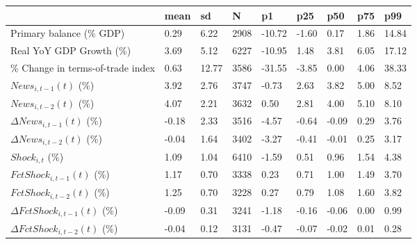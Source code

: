 \begin{table}[htbp]
\begin{tabular}{|l|l|l|l|l|l|l|l|l|}\hline  
 & mean  & sd  & N  & p1  & p25  & p50  & p75  & p99  \\ \hline  
Primary balance (\% GDP) &      0.29 &      6.22 &      2908 &    -10.72 &     -1.60 &      0.17 &      1.86 &     14.84 \\ \hline 
Real YoY GDP Growth (\%) &      3.69 &      5.12 &      6227 &    -10.95 &      1.48 &      3.81 &      6.05 &     17.12 \\ \hline 
\% Change in terms-of-trade index &      0.63 &     12.77 &      3586 &    -31.55 &     -3.85 &      0.00 &      4.06 &     38.33 \\ \hline 
$ News_{i,t-1}(t)$ (\%) &      3.92 &      2.76 &      3747 &     -0.73 &      2.63 &      3.82 &      5.00 &      8.52 \\ \hline 
$ News_{i,t-2}(t)$ (\%) &      4.07 &      2.21 &      3632 &      0.50 &      2.81 &      4.00 &      5.10 &      8.10 \\ \hline 
$ \Delta News_{i,t-1}(t)$ (\%) &     -0.18 &      2.33 &      3516 &     -4.57 &     -0.64 &     -0.09 &      0.29 &      3.76 \\ \hline 
$ \Delta News_{i,t-2}(t)$ (\%) &     -0.04 &      1.64 &      3402 &     -3.27 &     -0.41 &     -0.01 &      0.25 &      3.17 \\ \hline 
$ Shock_{i,t}$ (\%) &      1.09 &      1.04 &      6410 &     -1.59 &      0.51 &      0.96 &      1.54 &      4.38 \\ \hline 
$ FctShock_{i,t-1}(t)$ (\%) &      1.17 &      0.70 &      3338 &      0.23 &      0.71 &      1.00 &      1.49 &      3.70 \\ \hline 
$ FctShock_{i,t-2}(t)$ (\%) &      1.25 &      0.70 &      3228 &      0.27 &      0.79 &      1.08 &      1.60 &      3.82 \\ \hline 
$ \Delta FctShock_{i,t-1}(t)$ (\%) &     -0.09 &      0.31 &      3241 &     -1.18 &     -0.16 &     -0.06 &      0.00 &      0.99 \\ \hline 
$ \Delta FctShock_{i,t-2}(t)$ (\%) &     -0.04 &      0.12 &      3131 &     -0.47 &     -0.07 &     -0.02 &      0.01 &      0.28 \\ \hline 
  \end{tabular}
\end{table}

